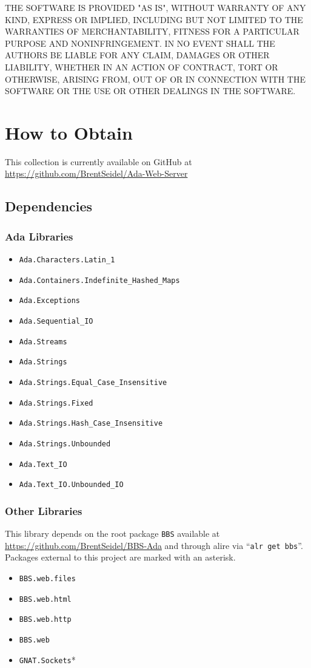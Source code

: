 \documentclass[10pt, openany]{book}
\newcommand{\package}[1]{\texttt{#1}}
\newcommand{\keyword}[1]{\texttt{#1}}
\begin{document}
THE SOFTWARE IS PROVIDED "AS IS", WITHOUT WARRANTY OF ANY KIND, EXPRESS OR IMPLIED, INCLUDING BUT NOT LIMITED TO THE WARRANTIES OF MERCHANTABILITY, FITNESS FOR A PARTICULAR PURPOSE AND NONINFRINGEMENT. IN NO EVENT SHALL THE AUTHORS BE LIABLE FOR ANY CLAIM, DAMAGES OR OTHER LIABILITY, WHETHER IN AN ACTION OF CONTRACT, TORT OR OTHERWISE, ARISING FROM, OUT OF OR IN CONNECTION WITH THE SOFTWARE OR THE USE OR OTHER DEALINGS IN THE SOFTWARE.

\chapter{How to Obtain}
This collection is currently available on GitHub at \url{https://github.com/BrentSeidel/Ada-Web-Server}

\section{Dependencies}
\subsection{Ada Libraries}
\begin{itemize}
  \item \package{Ada.Characters.Latin\_1}
  \item \package{Ada.Containers.Indefinite\_Hashed\_Maps}
  \item \package{Ada.Exceptions}
  \item \package{Ada.Sequential\_IO}
  \item \package{Ada.Streams}
  \item \package{Ada.Strings}
  \item \package{Ada.Strings.Equal\_Case\_Insensitive}
  \item \package{Ada.Strings.Fixed}
  \item \package{Ada.Strings.Hash\_Case\_Insensitive}
  \item \package{Ada.Strings.Unbounded}
  \item \package{Ada.Text\_IO}
  \item \package{Ada.Text\_IO.Unbounded\_IO}
\end{itemize}

\subsection{Other Libraries}
This library depends on the root package \package{BBS} available at \url{https://github.com/BrentSeidel/BBS-Ada} and through alire via ``\keyword{alr get bbs}''.   Packages external to this project are marked with an asterisk.
\begin{itemize}
  \item \package{BBS.web.files}
  \item \package{BBS.web.html}
  \item \package{BBS.web.http}
  \item \package{BBS.web}
  \item \package{GNAT.Sockets}*
\end{itemize}
\end{document}
